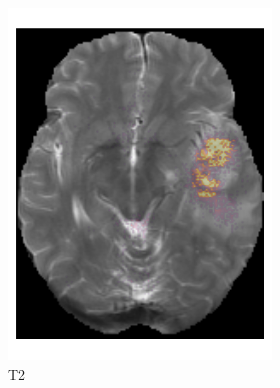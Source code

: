 \begin{figure}[htbp]
\begin{subfigure}[b]{\textwidth}
\begin{subfigure}[b]{0.24\textwidth}
        \includegraphics[width=\textwidth]{Figures/saliency_HGG_T2.png}
        \caption*{\acrshort{T2}}
        \end{subfigure}
        \hfill
        \begin{subfigure}[b]{0.24\textwidth}

\end{subfigure}
\end{subfigure}
\end{figure}
